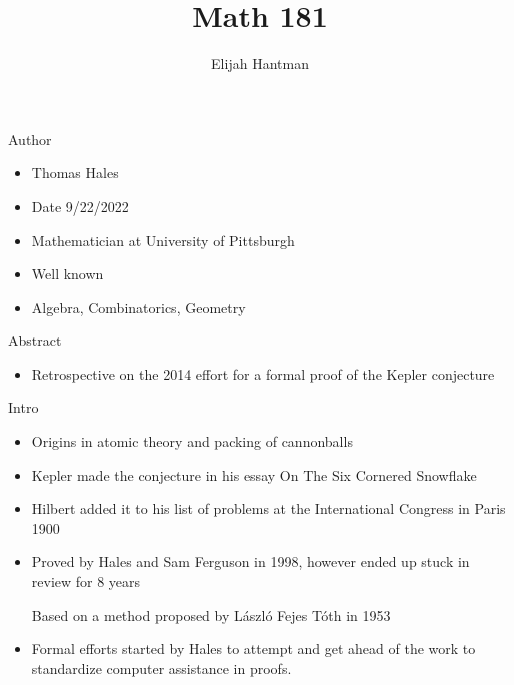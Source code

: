 \documentclass{report}
\title{\Huge{Math 181}}
\author{\huge{Elijah Hantman}}
\date{}
\begin{document}
\maketitle
\newpage

{\large Author}
\begin{itemize}
    \item Thomas Hales
    \item Date 9/22/2022
    \item Mathematician at University of Pittsburgh
    \item Well known
    \item Algebra, Combinatorics, Geometry
\end{itemize}

{\large Abstract}
\begin{itemize}
    \item Retrospective on the 2014 effort for a formal
        proof of the Kepler conjecture
\end{itemize}

{\large Intro}
\begin{itemize}
    \item Origins in atomic theory and packing of cannonballs
    \item Kepler made the conjecture in his essay
        On The Six Cornered Snowflake
    \item Hilbert added it to his list of problems at the
        International Congress in Paris 1900
    \item Proved by Hales and Sam Ferguson in 1998,
        however ended up stuck in review for 8 years
        \begin{mdframed}
            Based on a method proposed by
            L\'aszl\'o Fejes T\'oth in 1953
        \end{mdframed}
    \item Formal efforts started by Hales to attempt and
        get ahead of the work to standardize computer
        assistance in proofs.
\end{itemize}
\end{document}
